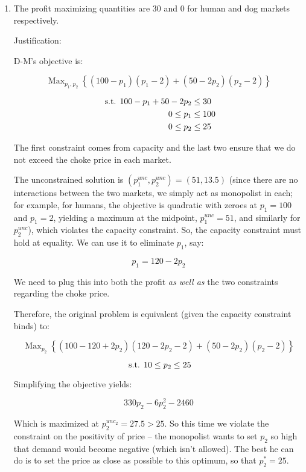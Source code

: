 \documentclass{article}
\DeclareMathOperator*{\Max}{Max}
\newcommand{\st}{\hbox{ s.t. }}
\newenvironment{solution}{\color{red}}{\color{black}}
\begin{document}
\begin{solution}

\begin{enumerate}
\item The profit maximizing quantities are $30$ and $0$ for human and dog markets respectively.

Justification:

D-M's objective is:

\[ \Max_{p_1,p_2} \left\{ (100-p_1)(p_1-2)+(50-2p_2)(p_2-2) \right\} \]

\begin{align*}
\st 100-p_1+50-2p_2 &\leq 30 \\
 0 \leq p_1 &\leq 100 \\
 0 \leq p_2 &\leq 25 \\
\end{align*}

The first constraint comes from capacity and the last two ensure that we do not exceed the choke price in each market.

The unconstrained solution is $(p_1^{unc}, p_2^{unc}) = (51, 13.5)$ (since there are no interactions between the two markets, we simply act as monopolist in each; for example, for humans, the objective is quadratic with zeroes at $p_1 = 100$ and $p_1 = 2$, yielding a maximum at the midpoint, $p_1^{unc} = 51$, and similarly for $p_2^{unc}$), which  violates the capacity constraint. So, the capacity constraint must hold at equality. We can use it to eliminate $p_1$, say:

\[ p_1=120-2p_2 \]

We need to plug this into both the profit \emph{as well as} the two constraints regarding the choke price.

Therefore, the original problem is equivalent (given the capacity constraint binds) to:

\[ \Max_{p_2} \left\{ (100-120+2p_2)(120-2p_2-2)+(50-2p_2)(p_2-2) \right\} \]

\[ \st 10 \leq p_2 \leq 25 \]

Simplifying the objective yields:

\[ 330p_2 -6p_2^2 - 2460 \]

Which is maximized at $p_2^{unc_2} = 27.5 > 25$. So this time we violate the constraint on the positivity of price -- the monopolist wants to set $p_2$ so high that demand would become negative (which isn't allowed). The best he can do is to set the price as close as possible to this optimum, so that $p_2^{*} = 25$.


\end{enumerate}
\end{solution}
\end{document}
